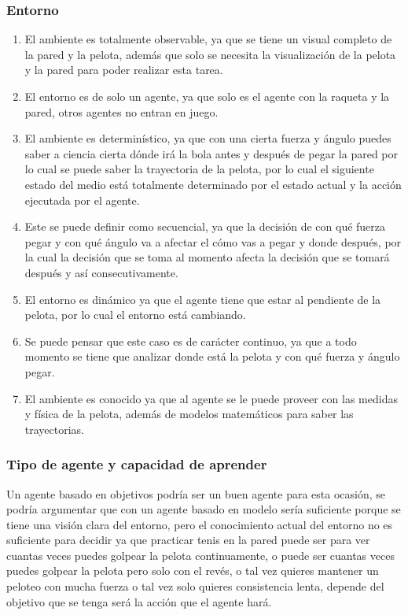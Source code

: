 \documentclass{article}
\begin{document}
            \subsubsection{Entorno}
                \begin{enumerate}
                    \item El ambiente es totalmente observable, ya que se tiene un visual completo de la pared y la pelota, además que solo se necesita la visualización de la pelota y la pared para poder realizar esta tarea. 
                    \item El entorno es de solo un agente, ya que solo es el agente con la raqueta y la pared, otros agentes no entran en juego.
                    \item El ambiente es determinístico, ya que con una cierta fuerza y ángulo puedes saber a ciencia cierta dónde irá la bola antes y después de pegar la pared por lo cual se puede saber la trayectoria de la pelota, por lo cual el siguiente estado del medio está totalmente determinado por el estado actual y la acción ejecutada por el agente.
                    \item Este se puede definir como secuencial, ya que la decisión de con qué fuerza pegar y con qué ángulo va a afectar el cómo vas a pegar y donde después, por la cual la decisión que se toma al momento afecta la decisión que se tomará después y así consecutivamente.
                    \item El entorno es dinámico ya que el agente tiene que estar al pendiente de la pelota, por lo cual el entorno está cambiando.
                    \item Se puede pensar que este caso es de carácter continuo, ya que a todo momento se tiene que analizar donde está la pelota y con qué fuerza y ángulo pegar.
                    \item El ambiente es conocido ya que al agente se le puede proveer con las medidas y física de la pelota, además de modelos matemáticos para saber las trayectorias.
                \end{enumerate}

            \subsubsection{Tipo de agente y capacidad de aprender}
                Un agente basado en objetivos podría ser un buen agente para esta ocasión, se podría argumentar que con un agente basado en modelo sería suficiente porque se tiene una visión clara del entorno, pero el conocimiento actual del entorno no es suficiente para decidir ya que practicar tenis en la pared puede ser para ver cuantas veces puedes golpear la pelota continuamente, o puede ser cuantas veces puedes golpear la pelota pero solo con el revés, o tal vez quieres mantener un peloteo con mucha fuerza o tal vez solo quieres consistencia lenta, depende del objetivo que se tenga será la acción que el agente hará.
                
\end{document}
